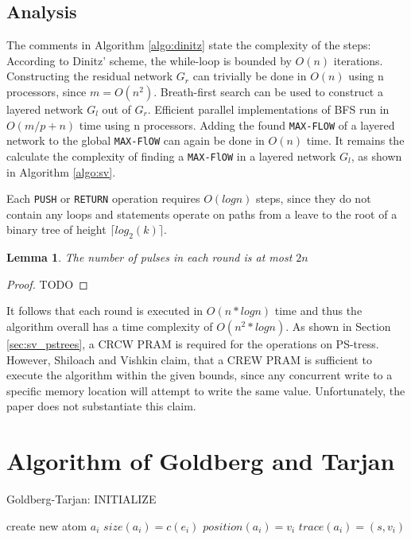 \documentclass[a4paper,10pt, twocolumn]{article}
\newtheorem{lemma}{Lemma}
\begin{document}
\subsection{Analysis}
\label{sec:sv_analysis}
The comments in Algorithm \ref{algo:dinitz} state the complexity of the steps: According to Dinitz' scheme, the while-loop is bounded by $O(n)$ iterations. Constructing the residual network $G_r$ can trivially be done in $O(n)$ using n processors, since $m = O(n^{2})$. Breath-first search can be used to construct a layered network $G_l$ out of $G_r$. Efficient parallel implementations of BFS run in $O(m/p +n)$ time using n processors. Adding the found \lstinline|MAX-FLOW| of a layered network to the global \lstinline|MAX-FlOW| can again be done in $O(n)$ time. It remains the calculate the complexity of finding a \lstinline|MAX-FlOW| in a layered network $G_l$, as shown in Algorithm \ref{algo:sv}.

Each \lstinline|PUSH| or \lstinline|RETURN| operation requires $O(log n)$ steps, since they do not contain any loops and statements operate on paths from a leave to the root of a binary tree of height $\lceil log_2(k) \rceil$.
\begin{lemma}
The number of pulses in each round is at most $2n$
\end{lemma}
\begin{proof}
TODO
\end{proof}

It follows that each round is executed in $O(n*log n)$ time and thus the algorithm overall has a time complexity of $O(n^{2} * log n)$. As shown in Section \ref{sec:sv_pstrees}, a CRCW PRAM is required for the operations on PS-tress. However, Shiloach and Vishkin claim\cite{yossi81}, that a CREW PRAM is sufficient to execute the algorithm within the given bounds, since any concurrent write to a specific memory location will attempt to write the same value. Unfortunately, the paper does not substantiate this claim. 

\section{Algorithm of Goldberg and Tarjan}
\label{sec:goldberg}

\begin{algorithm}
\caption{Goldberg-Tarjan: INITIALIZE}
\label{algo:gt_init}
\begin{algorithmic}[1]
		\State create new atom $a_i$
		\State $size(a_i) = c(e_i)$
		\State $position(a_i) = v_i$
		\State $trace(a_i) = (s,v_i)$		
	\EndFor
	\EndFunction
\end{algorithmic}
\end{algorithm}
\end{document}
